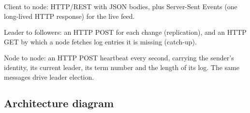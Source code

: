 \documentclass[10pt,a4paper]{article}
\begin{document}
\begin{description}[leftmargin=1.2cm,style=sameline]
\item[A] Client to node: HTTP/REST with JSON bodies, plus Server-Sent Events (one long-lived HTTP
response) for the live feed.
\item[B] Leader to followers: an HTTP POST for each change (replication), and an HTTP GET by
which a node fetches log entries it is missing (catch-up).
\item[C] Node to node: an HTTP POST heartbeat every second, carrying the sender's identity, its
current leader, its term number and the length of its log. The same messages drive leader
election.
\end{description}

\subsection{Architecture diagram}
\end{document}
